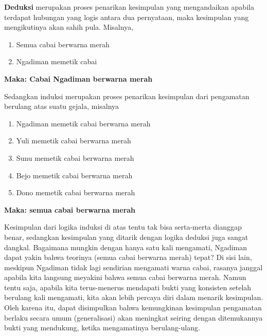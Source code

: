 \documentclass[
  english,
  man]{apa6}
\providecommand{\tightlist}{%
  \setlength{\itemsep}{0pt}\setlength{\parskip}{0pt}}
\begin{document}
\textbf{Deduksi} merupakan proses penarikan kesimpulan yang mengandaikan apabila terdapat hubungan yang logis antara dua pernyataan, maka kesimpulan yang mengikutinya akan sahih pula. Misalnya,

\begin{enumerate}
\def\labelenumi{\arabic{enumi}.}
\tightlist
\item
  Semua cabai berwarna merah
\item
  Ngadiman memetik cabai
\end{enumerate}

\textbf{Maka: Cabai Ngadiman berwarna merah}

Sedangkan induksi merupakan proses penarikan kesimpulan dari pengamatan berulang atas suatu gejala, misalnya

\begin{enumerate}
\def\labelenumi{\arabic{enumi}.}
\tightlist
\item
  Ngadiman memetik cabai berwarna merah
\item
  Yuli memetik cabai berwarna merah
\item
  Sunu memetik cabai berwarna merah
\item
  Bejo memetik cabai berwarna merah
\item
  Dono memetik cabai berwarna merah
\end{enumerate}

\textbf{Maka: semua cabai berwarna merah}

Kesimpulan dari logika induksi di atas tentu tak bisa serta-merta dianggap benar, sedangkan kesimpulan yang ditarik dengan logika deduksi juga sangat dangkal. Bagaimana mungkin dengan hanya satu kali mengamati, Ngadiman dapat yakin bahwa teorinya (semua cabai berwarna merah) tepat? Di sisi lain, meskipun Ngadiman tidak lagi sendirian mengamati warna cabai, rasanya janggal apabila kita langsung meyakini bahwa semua cabai berwarna merah. Namun tentu saja, apabila kita terus-menerus mendapati bukti yang konsisten setelah berulang kali mengamati, kita akan lebih percaya diri dalam menarik kesimpulan. Oleh karena itu, dapat disimpulkan bahwa kemungkinan kesimpulan pengamatan berlaku secara umum (generalisasi) akan meningkat seiring dengan ditemukannya bukti yang mendukung, ketika mengamatinya berulang-ulang.
\end{document}
